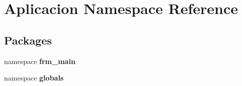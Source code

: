 \section{\-Aplicacion \-Namespace \-Reference}
\label{namespace_aplicacion}
\subsection*{\-Packages}
\begin{DoxyCompactItemize}
\item 
namespace {\bf frm\-\_\-main}
\item 
namespace {\bf globals}
\end{DoxyCompactItemize}
